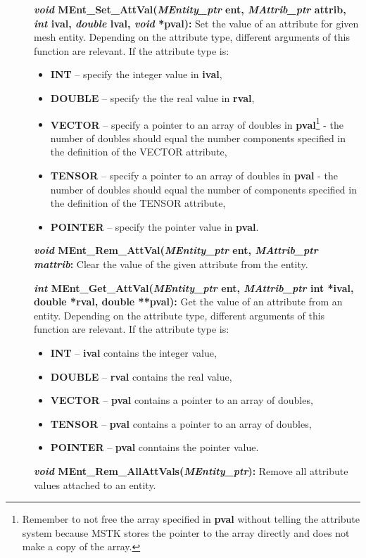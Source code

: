 \documentclass[12pt]{article}
\begin{document}
\begin{description}
\item[]
  
\item[]{\bf {\em void} MEnt\_Set\_AttVal({\em MEntity\_ptr} ent, {\em
      MAttrib\_ptr} attrib, {\em int} ival, {\em double} lval, {\em
      void} *pval):} Set the value of an attribute for given mesh
  entity. Depending on the attribute type, different arguments of this
  function are relevant. If the attribute type is:

\begin{itemize}
  \item {\bf INT} -- specify the integer value in {\bf ival},
  \item {\bf DOUBLE} -- specify the the real value in {\bf rval},
  \item {\bf VECTOR} -- specify a pointer to an array of
    doubles in {\bf pval}\footnote{Remember to not free the array specified in {\bf pval} without telling the attribute system because MSTK stores the pointer to the array directly and does not make a copy of the array.} - the number of doubles should equal the number components specified in the definition of the VECTOR attribute,
  \item {\bf TENSOR} -- specify a pointer
    to an array of doubles in {\bf pval} - the number of doubles should equal the number of components specified in the definition of the TENSOR attribute,
  \item {\bf POINTER} -- specify the pointer value in {\bf pval}.
  \end{itemize}


    
\item[]{\bf {\em void} MEnt\_Rem\_AttVal({\em MEntity\_ptr}
    ent, {\em MAttrib\_ptr mattrib}:} Clear the value of the given
  attribute from the entity.
    
\item[]{\bf {\em int} MEnt\_Get\_AttVal({\em MEntity\_ptr} ent, {\em
      MAttrib\_ptr} int *ival, double *rval, double **pval):} Get the
  value of an attribute from an entity.  Depending on the attribute
  type, different arguments of this function are relevant. If the
  attribute type is:

  \begin{itemize}
  \item {\bf INT} -- {\bf ival} contains the integer value,
  \item {\bf DOUBLE} -- {\bf rval} contains the real value,
  \item {\bf VECTOR} -- {\bf pval} contains a pointer to an array of doubles,
  \item {\bf TENSOR} -- {\bf pval} contains a pointer
    to an array of doubles,
  \item {\bf POINTER} -- {\bf pval} conntains the pointer value.
  \end{itemize}

\item[]{\bf {\em void} MEnt\_Rem\_AllAttVals({\em MEntity\_ptr}):}
  Remove all attribute values attached to an entity.

\end{description}
\end{document}
